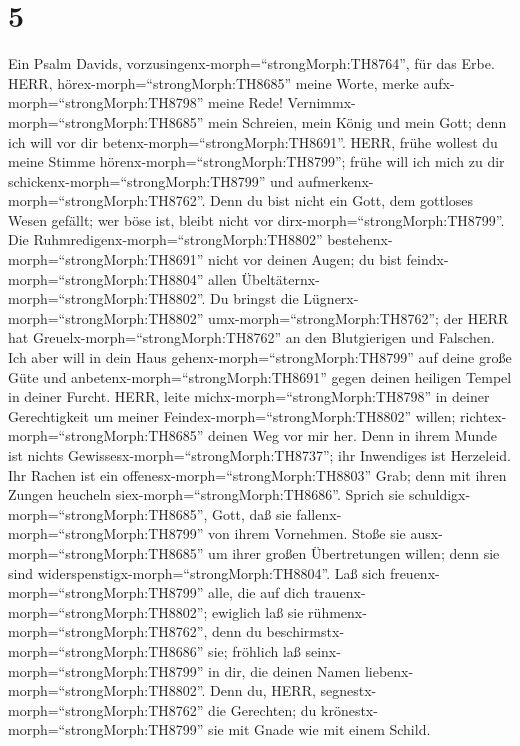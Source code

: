 \hypertarget{section-4}{%
\section{5}\label{section-4}}

 Ein Psalm Davids,
vorzusingenx-morph=``strongMorph:TH8764'', für das Erbe. HERR,
hörex-morph=``strongMorph:TH8685'' meine Worte, merke
aufx-morph=``strongMorph:TH8798'' meine Rede! 
Vernimmx-morph=``strongMorph:TH8685'' mein Schreien, mein König und mein
Gott; denn ich will vor dir betenx-morph=``strongMorph:TH8691''.
 HERR, frühe wollest du meine Stimme
hörenx-morph=``strongMorph:TH8799''; frühe will ich mich zu dir
schickenx-morph=``strongMorph:TH8799'' und
aufmerkenx-morph=``strongMorph:TH8762''.  Denn du bist nicht
ein Gott, dem gottloses Wesen gefällt; wer böse ist, bleibt nicht vor
dirx-morph=``strongMorph:TH8799''.  Die
Ruhmredigenx-morph=``strongMorph:TH8802''
bestehenx-morph=``strongMorph:TH8691'' nicht vor deinen Augen; du bist
feindx-morph=``strongMorph:TH8804'' allen
Übeltäternx-morph=``strongMorph:TH8802''.  Du bringst die
Lügnerx-morph=``strongMorph:TH8802'' umx-morph=``strongMorph:TH8762'';
der HERR hat Greuelx-morph=``strongMorph:TH8762'' an den Blutgierigen
und Falschen.  Ich aber will in dein Haus
gehenx-morph=``strongMorph:TH8799'' auf deine große Güte und
anbetenx-morph=``strongMorph:TH8691'' gegen deinen heiligen Tempel in
deiner Furcht.  HERR, leite
michx-morph=``strongMorph:TH8798'' in deiner Gerechtigkeit um meiner
Feindex-morph=``strongMorph:TH8802'' willen;
richtex-morph=``strongMorph:TH8685'' deinen Weg vor mir her.
 Denn in ihrem Munde ist nichts
Gewissesx-morph=``strongMorph:TH8737''; ihr Inwendiges ist Herzeleid.
Ihr Rachen ist ein offenesx-morph=``strongMorph:TH8803'' Grab; denn mit
ihren Zungen heucheln siex-morph=``strongMorph:TH8686''. 
Sprich sie schuldigx-morph=``strongMorph:TH8685'', Gott, daß sie
fallenx-morph=``strongMorph:TH8799'' von ihrem Vornehmen. Stoße sie
ausx-morph=``strongMorph:TH8685'' um ihrer großen Übertretungen willen;
denn sie sind widerspenstigx-morph=``strongMorph:TH8804''. 
Laß sich freuenx-morph=``strongMorph:TH8799'' alle, die auf dich
trauenx-morph=``strongMorph:TH8802''; ewiglich laß sie
rühmenx-morph=``strongMorph:TH8762'', denn du
beschirmstx-morph=``strongMorph:TH8686'' sie; fröhlich laß
seinx-morph=``strongMorph:TH8799'' in dir, die deinen Namen
liebenx-morph=``strongMorph:TH8802''.  Denn du, HERR,
segnestx-morph=``strongMorph:TH8762'' die Gerechten; du
krönestx-morph=``strongMorph:TH8799'' sie mit Gnade wie mit einem
Schild.

